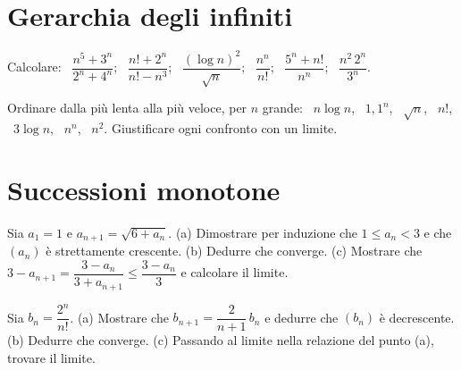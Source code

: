 \section{Gerarchia degli infiniti}

\begin{esercizio}[\liv{1}]
Calcolare: \ $\dfrac{n^5+3^n}{2^n+4^n}$; \ $\dfrac{n!+2^n}{n!-n^3}$; \ $\dfrac{(\log n)^2}{\sqrt n}$; \ $\dfrac{n^n}{n!}$; \ $\dfrac{5^n+n!}{n^n}$; \ $\dfrac{n^2\,2^n}{3^n}$.
\end{esercizio}

\begin{esercizio}[\liv{2}]
Ordinare dalla più lenta alla più veloce, per $n$ grande: \ $n\log n$, \ $1{,}1^n$, \ $\sqrt n$, \ $n!$, \ $3\log n$, \ $n^n$, \ $n^2$. Giustificare ogni confronto con un limite.
\end{esercizio}

\section{Successioni monotone}

\begin{esercizio}[\liv{2}]
Sia $a_1=1$ e $a_{n+1}=\sqrt{6+a_n}$. (a) Dimostrare per induzione che $1\le a_n<3$ e che $(a_n)$ è strettamente crescente. (b) Dedurre che converge. (c) Mostrare che $3-a_{n+1}=\dfrac{3-a_n}{3+a_{n+1}}\le\dfrac{3-a_n}3$ e calcolare il limite.
\end{esercizio}

\begin{esercizio}[\liv{2}]
Sia $b_n=\dfrac{2^n}{n!}$. (a) Mostrare che $b_{n+1}=\dfrac2{n+1}\,b_n$ e dedurre che $(b_n)$ è decrescente. (b) Dedurre che converge. (c) Passando al limite nella relazione del punto (a), trovare il limite.
\end{esercizio}


